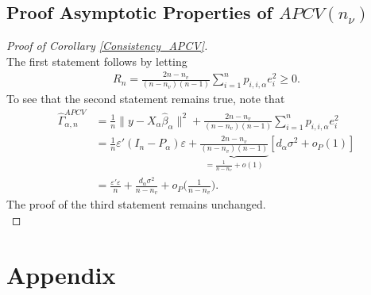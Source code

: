 \documentclass[Research_Module_ES.tex]{subfiles}
\begin{document}
\subsection{Proof Asymptotic Properties of $APCV(n_\nu)$}
\begin{proof}[Proof of Corollary \ref{Consistency_APCV}]~\\
	The first statement follows by letting 
	\begin{align*}
	R_n= \frac{2n-n_v}{(n-n_v)(n-1)}\sum_{i=1}^np_{i,i,\alpha}e_i^2\ge 0.
	\end{align*}
	To see that the second statement remains true, note that
	\begin{align*}
	\hat{\Gamma}_{\alpha,n}^{APCV} &= \frac{1}{n}\lVert y-X_\alpha\hat{\beta}_\alpha\rVert^2 +\frac{2n-n_v}{(n-n_v)(n-1)}\sum_{i=1}^np_{i,i,\alpha}e_i^2\\
	&=\frac{1}{n} \varepsilon'(I_n-P_\alpha)\varepsilon+ \underbrace{\frac{2n-n_v}{(n-n_v)(n-1)}}_{=\frac{1}{n-n_v}+o(1)}[d_\alpha\sigma^2+o_P(1)]\\
	&=\frac{\varepsilon'\varepsilon}{n} + \frac{d_\alpha\sigma^2}{n-n_v}+o_P\biggl(\frac{1}{n-n_v}\biggr).
	\end{align*}
	The proof of the third statement remains unchanged. \\
\end{proof}
\section{Appendix}\label{BAppendix}
\end{document}
